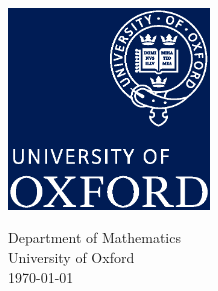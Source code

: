 \documentclass[../dissertation.tex]{subfiles}
\begin{document}
\begin{titlepage}
    \begin{center}
        \vspace*{1cm}

        \Huge
        \textbf{\titlename}

        \vspace{0.5cm}

        \vspace{1.5cm}


        \vfill



        \includegraphics[width=0.4\textwidth]{oxfordlogo}

        \vspace{0.34\textheight}

        \large
        Department of Mathematics\\
        University of Oxford\\
        \today

    \end{center}
\end{titlepage}
\end{document}
